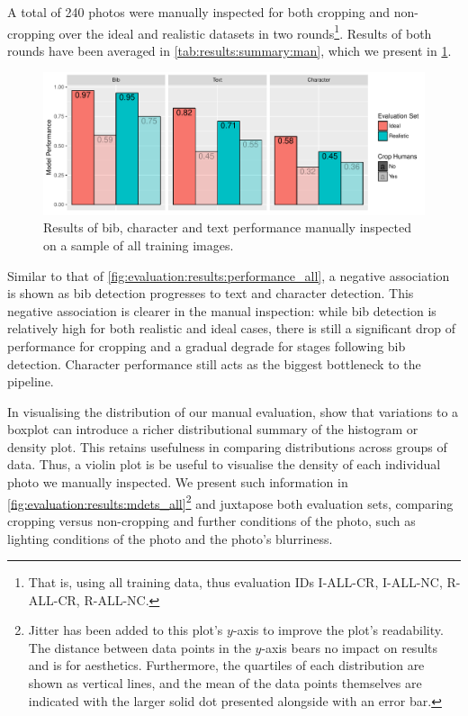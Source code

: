 A total of 240 photos were manually inspected for both cropping and non-cropping over the ideal and realistic datasets in two rounds\footnote{That is, using all training data, thus evaluation IDs I-ALL-CR, I-ALL-NC, R-ALL-CR, R-ALL-NC.}. Results of both rounds have been averaged in \cref{tab:results:summary:man}, which we present in \cref{fig:evaluation:results:performance_man}.

\begin{figure}[h]
  \centering
  \includegraphics[width=1\textwidth]{images/evaluation/ManualSummary}
  \caption[Bib, text and character performance of manual inspection]{Results of bib, character and text performance manually inspected on a sample of all training images.}
  \label{fig:evaluation:results:performance_man}
\end{figure}

Similar to that of \cref{fig:evaluation:results:performance_all}, a negative association is shown as bib detection progresses to text and character detection. This negative association is clearer in the manual inspection: while bib detection is relatively high for both realistic and ideal cases, there is still a significant drop of performance for cropping and a gradual degrade for stages following bib detection. Character performance still acts as the biggest bottleneck to the pipeline.

In visualising the distribution of our manual evaluation, \citet{wickham:boxplots} show that variations to a boxplot can introduce a richer distributional summary of the histogram or density plot. This retains usefulness in comparing distributions across groups of data. Thus, a violin plot \citep{Hintze:1998fn} is be useful to visualise the density of each individual photo we manually inspected. We present such information in \cref{fig:evaluation:results:mdets_all}\footnote{Jitter has been added to this plot's $y$-axis to improve the plot's readability. The distance between data points in the $y$-axis bears no impact on results and is for aesthetics. Furthermore, the quartiles of each distribution are shown as vertical lines, and the mean of the data points themselves are indicated with the larger solid dot presented alongside with an error bar.} and juxtapose both evaluation sets, comparing cropping versus non-cropping and further conditions of the photo, such as lighting conditions of the photo and the photo's blurriness.

